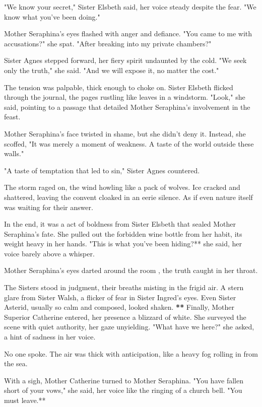 \documentclass[11pt]{article}
\begin{document}
"We know your secret," Sister Elsbeth said, her voice steady despite the fear. "We know what you've been doing."

Mother Seraphina's eyes flashed with anger and defiance. "You came to me with accusations?" she spat. "After breaking into my private chambers?"

Sister Agnes stepped forward, her fiery spirit undaunted by the cold. "We seek only the truth," she said. "And we will expose it, no matter the cost."

The tension was palpable, thick enough to choke on. Sister Elsbeth flicked through the journal, the pages rustling like leaves in a windstorm. "Look," she said, pointing to a passage that detailed Mother Seraphina's involvement in the feast.

Mother Seraphina's face twisted in shame, but she didn't deny it. Instead, she scoffed, "It was merely a moment of weakness. A taste of the world outside these walls."

"A taste of temptation that led to sin," Sister Agnes countered.

The storm raged on, the wind howling like a pack of wolves. Ice cracked and shattered, leaving the convent cloaked in an eerie silence. As if even nature itself was waiting for their answer.

In the end, it was a act of boldness from Sister Elsbeth that sealed Mother Seraphina's fate. She pulled out the forbidden wine bottle from her habit, its weight heavy in her hands. "This is what you've been hiding?** she said, her voice barely above a whisper.

Mother Seraphina's eyes darted around the room , the truth caught in her throat.

The Sisters stood in judgment, their breaths misting in the frigid air. A stern glare from Sister Walsh, a flicker of fear in Sister Ingred's eyes. Even Sister Asterid, usually so calm and composed, looked shaken.
\textbf{\textbf{\textbf{**}}}
Finally, Mother Superior Catherine entered, her presence a blizzard of white. She surveyed the scene with quiet authority, her gaze unyielding. "What have we here?" she asked, a hint of sadness in her voice.

No one spoke. The air was thick with anticipation, like a heavy fog rolling in from the sea.

With a sigh, Mother Catherine turned to Mother Seraphina. "You have fallen short of your vows," she said, her voice like the ringing of a church bell. "You must leave.**
\end{document}
